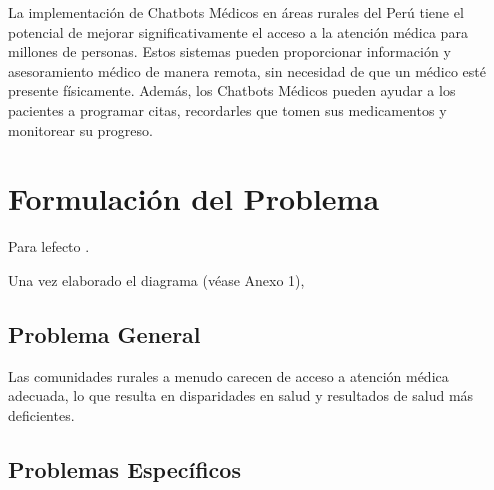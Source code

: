 La implementación de Chatbots Médicos en áreas rurales del Perú tiene el potencial de mejorar significativamente el acceso a la atención médica para millones de personas. Estos sistemas pueden proporcionar información y asesoramiento médico de manera remota, sin necesidad de que un médico esté presente físicamente. Además, los Chatbots Médicos pueden ayudar a los pacientes a programar citas, recordarles que tomen sus medicamentos y monitorear su progreso. 




\section{Formulación del Problema}

Para lefecto \parencite{ot_marti2018manual}. 


Una vez elaborado el diagrama (véase Anexo 1), 

\subsection{Problema General}
\newcommand{\ProblemaGeneral}{
	Las comunidades rurales a menudo carecen de acceso a atención médica adecuada, lo que resulta en disparidades en salud y resultados de salud más deficientes.
}
\ProblemaGeneral
\subsection{Problemas Espec\'{i}ficos}
\newcommand{\Pbone}{
Las áreas rurales generalmente tienen una menor cantidad de médicos, enfermeras y otros profesionales de la salud en comparación con las áreas urbanas.
}
\newcommand{\Pbtwo}{
Las largas distancias y el transporte deficiente dificultan el acceso a los centros de atención médica para los residentes rurales.
}
\newcommand{\Pbthree}{
La pobreza, el desempleo y la falta de seguro médico pueden impedir que las personas en áreas rurales accedan a la atención médica.
}
\newcommand{\Pbfour}{
Las diferencias culturales y lingüísticas pueden crear dificultades para que las personas en áreas rurales se comuniquen con los proveedores de atención médica y comprendan las opciones de tratamiento.
}
\newcommand{\Pbfive}{
	
}

